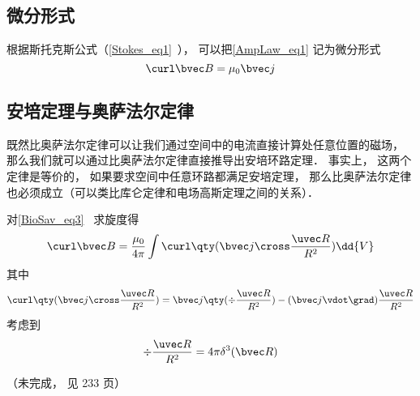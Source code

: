 \subsection{微分形式}
根据斯托克斯公式（\autoref{Stokes_eq1}~）， 可以把\autoref{AmpLaw_eq1} 记为微分形式
\begin{equation}
\curl \bvec B = \mu_0 \bvec j
\end{equation}



\subsection{安培定理与奥萨法尔定律}
既然比奥萨法尔定律可以让我们通过空间中的电流直接计算处任意位置的磁场， 那么我们就可以通过比奥萨法尔定律直接推导出安培环路定理． 事实上， 这两个定律是等价的， 如果要求空间中任意环路都满足安培定理， 那么比奥萨法尔定律也必须成立（可以类比库仑定律和电场高斯定理之间的关系）．%

对\autoref{BioSav_eq3}~ 求旋度得
\begin{equation}
\curl \bvec B = \frac{\mu_0}{4\pi} \int \curl \qty(\bvec j \cross \frac{\uvec R}{R^2}) \dd{V}
\end{equation}
其中
\begin{equation}
\curl \qty(\bvec j \cross \frac{\uvec R}{R^2}) = \bvec j \qty(\div \frac{\uvec R}{R^2}) - (\bvec j \vdot \grad) \frac{\uvec R}{R^2}
\end{equation}
考虑到
\begin{equation}
\div \frac{\uvec R}{R^2} = 4\pi \delta^3(\bvec R)
\end{equation}


（未完成， 见 \cite{GriffE} 233 页）
